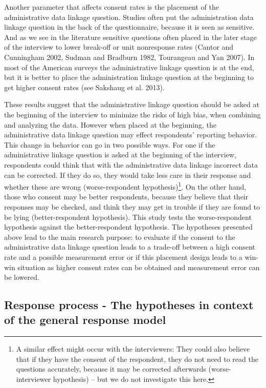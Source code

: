 Another parameter that affects consent rates is the placement of the administrative data linkage question. Studies often put the administration data linkage question in the back of the questionnaire, because it is seen as sensitive. And as we see in the literature sensitive questions often placed in the later stage of the interview to lower break-off or unit nonresponse rates (Cantor and Cunningham 2002, Sudman and Bradburn 1982, Tourangeau and Yan 2007). In most of the American surveys the administrative linkage question is at the end, but it is better to place the administration linkage question at the beginning to get higher consent rates (see Sakshaug et al. 2013).

These results suggest that the administrative linkage question should be asked at the beginning of the interview to minimize the risks of high bias, when combining and analyzing the data. However when placed at the beginning, the administrative data linkage question may effect respondents' reporting behavior. This change in behavior can go in two possible ways. For one if the administrative linkage question is asked at the beginning of the interview, respondents could think that with the administrative data linkage incorrect data can be corrected. If they do so, they would take less care in their response and whether these are wrong (worse-respondent hypothesis)\footnote{A similar effect might occur with the interviewers: They could also believe that if they have the consent of the respondent, they do not need to read the questions accurately, because it may be corrected afterwards (worse-interviewer hypothesis) -- but we do not investigate this here.}. On the other hand, those who consent may be better respondents, because they believe that their responses may be checked, and think they may get in trouble if they are found to be lying (better-respondent hypothesis). This study tests the worse-respondent hypothesis against the better-respondent hypothesis. The hypotheses presented above lead to the main research purpose: to evaluate if the consent to the administrative data linkage question leads to a trade-off between a high consent rate and a possible measurement error or if this placement design leads to a win-win situation as higher consent rates can be obtained and measurement error can be lowered.

\subsection{Response process - The hypotheses in context of the general response model}


